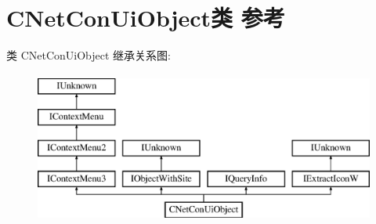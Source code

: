 \hypertarget{class_c_net_con_ui_object}{}\section{C\+Net\+Con\+Ui\+Object类 参考}
\label{class_c_net_con_ui_object}
类 C\+Net\+Con\+Ui\+Object 继承关系图\+:\begin{figure}[H]
\begin{center}
\leavevmode
\includegraphics[height=5.000000cm]{class_c_net_con_ui_object}
\end{center}
\end{figure}

